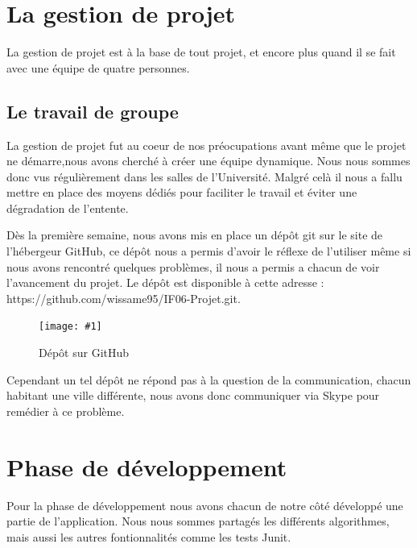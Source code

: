 ﻿\documentclass[a4paper,twoside,12pt]{report}
\newcommand{\monimage}[4]{
\par\noindent
\begin{figure}[H] %
\begin{center}
\texttt{[image: \#1]} %
\caption{#2} %
\label{#3} %
\end{center}
\end{figure} %
}
\begin{document}
\chapter{La gestion de projet}
%
\par
La gestion de projet est à la base de tout projet, et encore plus quand il se 
fait avec une équipe de quatre personnes.
\section{Le travail de groupe}
%
\par
La gestion de projet fut au coeur de nos préocupations avant même que le projet 
ne démarre,nous avons cherché à créer une équipe dynamique. Nous nous sommes 
donc vus régulièrement dans les salles de l'Université. Malgré celà il nous a 
fallu mettre en place des moyens dédiés pour faciliter le travail et éviter une 
dégradation de l'entente.
\par\noindent
 Dès la première semaine, nous avons mis en place un dépôt git sur le site de 
l'hébergeur GitHub, ce dépôt nous a permis d'avoir le réflexe de l'utiliser même 
 si nous avons rencontré quelques problèmes, il nous a permis a chacun de voir 
l'avancement du projet. Le dépôt est disponible à cette adresse : https://github.com/wissame95/IF06-Projet.git.
\monimage{DepotGit.png}{Dépôt sur GitHub}{depot}{0.8}
\par\noindent
 Cependant un tel dépôt ne répond pas à la question de la communication, chacun 
habitant une ville différente, nous avons donc communiquer via Skype pour 
remédier à ce problème.

\chapter{Phase de développement}
%
\par
Pour la phase de développement nous avons chacun de notre côté développé une 
partie de l'application. Nous nous sommes partagés les différents 
algorithmes, mais aussi les autres fontionnalités comme les tests Junit.
\end{document}
